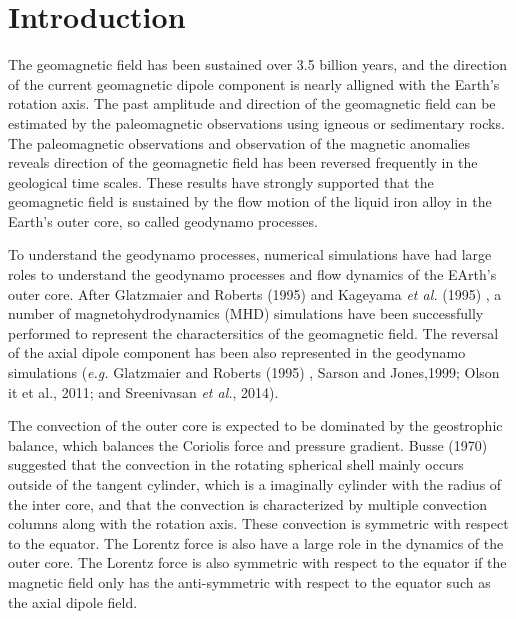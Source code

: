 \section{Introduction}
The geomagnetic field has been sustained over 3.5 billion years, and the direction of the current geomagnetic dipole component is nearly alligned with the Earth's rotation axis. The past amplitude and direction of the geomagnetic field can be estimated by the paleomagnetic observations using igneous or sedimentary rocks. The paleomagnetic observations and observation of the magnetic anomalies reveals direction of the geomagnetic field has been reversed frequently in the geological time scales. These results have strongly supported that the geomagnetic field is sustained by the flow motion of the liquid iron alloy in the Earth's outer core, so called geodynamo processes. 

To understand the geodynamo processes, numerical simulations have had large roles to understand the geodynamo processes and flow dynamics of the EArth's outer core. After Glatzmaier and Roberts (1995) \cite{Glatz:95} and Kageyama {\it et al.} (1995) \cite{Kageyama:95}, a number of magnetohydrodynamics (MHD) simulations have been successfully performed to represent the charactersitics of the geomagnetic field. The reversal of the axial dipole component has been also represented in the geodynamo simulations ({\it e.g.} Glatzmaier and Roberts (1995) \cite{Glatz:95}, Sarson and Jones,1999\cite{Jones:99}; Olson {it et al.}, 2011; and Sreenivasan {\it et al.}, 2014).

The convection of the outer core is expected to be dominated by the geostrophic balance,  which balances the Coriolis force and pressure gradient. Busse (1970) \cite{Busse:70} suggested that the convection in the rotating spherical shell mainly occurs outside of the tangent cylinder, which is a imaginally cylinder with the radius of the inter core, and that the convection is characterized by multiple convection columns along with the rotation axis. These convection is symmetric with respect to the equator. The Lorentz force is also have a large role in the dynamics of the outer core. The Lorentz force is also symmetric with respect to the equator if the magnetic field only has the anti-symmetric with respect to the equator such as the axial dipole field. 